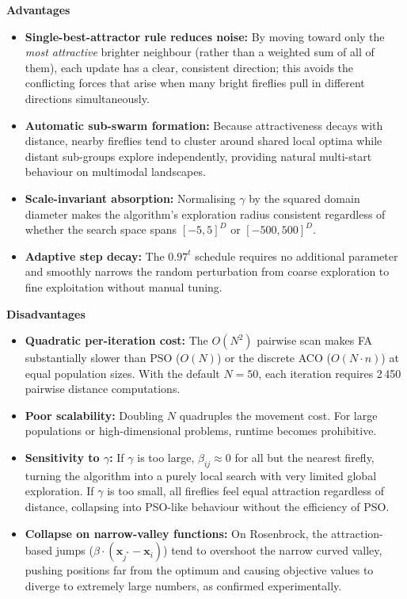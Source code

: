 \textbf{Advantages}

\begin{itemize}
  \item \textbf{Single-best-attractor rule reduces noise:} By moving toward only the
        \textit{most attractive} brighter neighbour (rather than a weighted sum of all of them),
        each update has a clear, consistent direction; this avoids the conflicting forces
        that arise when many bright fireflies pull in different directions simultaneously.
  \item \textbf{Automatic sub-swarm formation:} Because attractiveness decays with distance,
        nearby fireflies tend to cluster around shared local optima while distant sub-groups
        explore independently, providing natural multi-start behaviour on multimodal landscapes.
  \item \textbf{Scale-invariant absorption:} Normalising $\gamma$ by the squared domain
        diameter makes the algorithm's exploration radius consistent regardless of whether the
        search space spans $[-5,5]^D$ or $[-500,500]^D$.
  \item \textbf{Adaptive step decay:} The $0.97^t$ schedule requires no additional parameter
        and smoothly narrows the random perturbation from coarse exploration to fine
        exploitation without manual tuning.
\end{itemize}

\textbf{Disadvantages}

\begin{itemize}
  \item \textbf{Quadratic per-iteration cost:} The $O(N^2)$ pairwise scan makes FA
        substantially slower than PSO ($O(N)$) or the discrete ACO ($O(N\cdot n)$) at equal
        population sizes. With the default $N=50$, each iteration requires 2\,450 pairwise
        distance computations.
  \item \textbf{Poor scalability:} Doubling $N$ quadruples the movement cost. For large
        populations or high-dimensional problems, runtime becomes prohibitive.
  \item \textbf{Sensitivity to $\gamma$:} If $\gamma$ is too large, $\beta_{ij}\approx 0$ for
        all but the nearest firefly, turning the algorithm into a purely local search with very
        limited global exploration. If $\gamma$ is too small, all fireflies feel equal
        attraction regardless of distance, collapsing into PSO-like behaviour without the
        efficiency of PSO.
  \item \textbf{Collapse on narrow-valley functions:} On Rosenbrock, the attraction-based
        jumps ($\beta\cdot(\mathbf{x}_{j^*}-\mathbf{x}_i)$) tend to overshoot the narrow
        curved valley, pushing positions far from the optimum and causing objective values
        to diverge to extremely large numbers, as confirmed experimentally.
\end{itemize}
